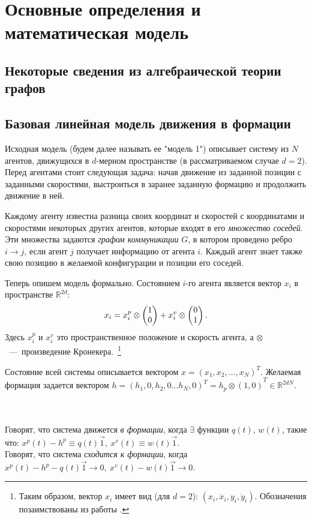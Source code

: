 \chapter{Основные определения и математическая модель} \label{definitions}

\section{Некоторые сведения из алгебраической теории графов}
\section{Базовая линейная модель движения в формации}
Исходная модель (будем далее называть ее "модель 1") описывает систему из $N$ агентов, движущихся в $d$-мерном пространстве (в рассматриваемом случае $d=2$). Перед агентами стоит следующая задача: начав движение из заданной позиции с заданными скоростями, выстроиться в заранее заданную формацию и продолжить движение в ней. 

Каждому агенту известна разница своих координат и скоростей с координатами и скоростями некоторых других агентов, которые входят в его \emph{множество соседей}. Эти множества задаются \emph{графом коммуникации} $G$, в котором проведено ребро $i\rightarrow j$, если агент $j$ получает информацию от агента $i$. Каждый агент знает также свою позицию в желаемой конфигурации и позиции его соседей.

Теперь опишем модель формально.
Состоянием $i$-го агента является  вектор $x_i$
в пространстве $\mathbb{R}^{2d}$:
$$x_i=x^p_i\otimes\veccol{1;0}+x^v_i\otimes
\veccol{0;1}.$$
Здесь $x^p_i$ и $x^v_i$ это пространственное положение и скорость агента, а $\otimes$\ ---\ произведение Кронекера.~\footnote{Таким образом, вектор $x_i$ имеет вид (для $d=2$): $\left(x_i, \dot{x}_i, y_i, \dot{y}_i\right)$. Обозначения позаимствованы из работы \cite{veerman2005flocks}.}

Состояние всей системы описывается вектором $x=\left(x_1,x_2,\ldots,x_N\right)^T$. Желаемая формация задается вектором 
$h={\left(h_1,0,h_2,0\ldots h_N,0\right)^T=h_p\otimes\left(1,0\right)}^T\in\mathbb{R}^{2dN}$.

\begin{definition}
\\\\
Говорят, что система движется \emph{в формации}, когда $\exists$ функции $q(t)$, $w(t)$, такие что:
$
x^p(t)-h^p\equiv q(t)\vec{1},\ x^v(t)\equiv w(t)\vec{1}.
$
\\
Говорят, что система \emph{сходится к формации}, когда
$
x^p(t)-h^p-q(t)\vec{1}\rightarrow 0,\ x^v(t)-w(t)\vec{1}\rightarrow 0.
$
\end{definition}

